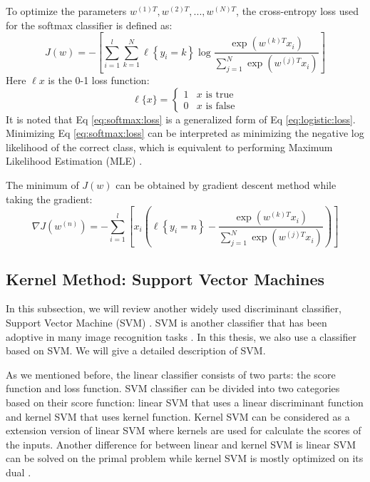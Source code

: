 To optimize the parameters $w^{(1)T},w^{({2})T},...,w^{({N})T}$, the cross-entropy loss used for the softmax classifier is defined as:
\begin{equation}
J(w) =  - \left[ {\sum\limits_{i = 1}^l {\sum\limits_{k = 1}^N {\ell\left\{ {{y_i} = k} \right\}\log \frac{{\exp \left( {{w^{(k)T}}x_i} \right)}}{{\sum\nolimits_{j = 1}^N {\exp \left( {{w^{(j)T}}x_i} \right)} }}} } } \right] \label{eq:softmax:loss}
\end{equation}
Here $\ell{x}$ is the 0-1 loss function:
\begin{equation}
\ell \{ x\}  = \left\{ {\begin{array}{*{20}{c}}
	1&\text{$x$ is true}\\
	0&\text{$x$ is false}
	\end{array}} \right. 
\end{equation}
It is noted that Eq \eqref{eq:softmax:loss} is a generalized form of Eq \eqref{eq:logistic:loss}. Minimizing Eq \eqref{eq:softmax:loss} can be interpreted as minimizing the negative log likelihood of the correct class, which is equivalent to performing Maximum Likelihood Estimation (MLE) \cite{johansen1990maximum}.

The minimum of $J(w)$ can be obtained by gradient descent method while taking the gradient:
\begin{equation}
\nabla J({w^{(n)}}) =  - \sum\limits_{i = 1}^l {\left[ {{x_i}\left( {\ell \left\{ {{y_i} = n} \right\} - \frac{{\exp \left( {{w^{(k)T}}x_i} \right)}}{{\sum\nolimits_{j = 1}^N {\exp \left( {{w^{(j)T}}x_i} \right)} }}} \right)} \right]} 
\end{equation}

\subsection{Kernel Method: Support Vector Machines}
In this subsection, we will review another widely used discriminant classifier, Support Vector Machine (SVM) \cite{cristianini2000introduction}. SVM is another classifier that has been adoptive in many image recognition tasks \cite{coates2011analysis} \cite{schuldt2004recognizing} \cite{yang2009linear}. In this thesis, we also use a classifier based on SVM. We will give a detailed description of SVM. 

As we mentioned before, the linear classifier consists of two parts: the score function and loss function. SVM classifier can be divided into two categories based on their score function: linear SVM that uses a linear discriminant function and kernel SVM that uses kernel function. Kernel SVM can be considered as a extension version of linear SVM where kernels are used for calculate the scores of the inputs. Another difference for between linear and kernel SVM is linear SVM can be solved on the primal problem while kernel SVM is mostly optimized on its dual \cite{cristianini2000introduction} \cite{shalev2011pegasos}.

